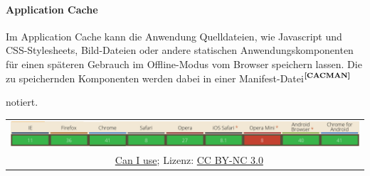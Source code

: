 \paragraph{Application Cache}
Im Application Cache kann die Anwendung Quelldateien, wie Javascript und CSS-Stylesheets, Bild-Dateien oder andere statischen Anwendungskomponenten für einen späteren Gebrauch im Offline-Modus vom Browser speichern lassen. Die zu speichernden Komponenten werden dabei in einer Manifest-Datei$^{\textbf{\ref{CACMAN}}}$%
\addtocounter{footnote}{1}%
notiert. 
	\begin{table}[H]
  		\begin{adjustwidth}{-1.5cm}{1.5cm}
		\centering
		\begin{tabulary}{20cm}{C}
	  		\includegraphics[scale=0.6]{bilder/screenshots/caniuse_appcache.png}\\ 
				\ccLogo\ 
				\begingroup
    				\fontsize{8pt}{12pt}\selectfont
    				\href{http://caniuse.com/\#search=Application\%20Cache}{Can I use}; Lizenz: \href{http://creativecommons.org/licenses/by-nc/3.0/}{CC BY-NC 3.0} 
				\endgroup
		\end{tabulary}
  		\end{adjustwidth}
	\end{table}


